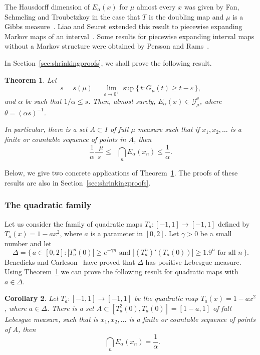 \documentclass[11pt]{article}
\newtheorem{theo}{Theorem}[section]
\newtheorem{coro}[theo]{Corollary}
\theoremstyle{definition}
\numberwithin{equation}{section}
\numberwithin{figure}{section}
\numberwithin{table}{section}
\DeclareMathOperator{\dimh}{dim_H}
\DeclareMathOperator{\udimh}{\overline{dim}_H}
\begin{document}
The Hausdorff dimension of $E_\alpha (x)$ for $\mu$ almost every $x$ was given by Fan, Schmeling and Troubetzkoy in the case that $T$ is the doubling map and $\mu$ is a Gibbs measure~\cite{fanschmelingtroubetzkoy}. Liao and Seuret extended this result to piecewise expanding Markov maps of an interval~\cite{liaoseuret}. Some results for piecewise expanding interval maps without a Markov structure were obtained by Persson and Rams~\cite{perssonrams}.

In Section~\ref{sec:shrinkingproofs}, we shall prove the following result.

\begin{theo}\label{the:shrinking}
Let
\[
s = s (\mu) = \lim_{\varepsilon \to 0^+} \sup \{\, t : G_\mu (t)
\geq t - \varepsilon \,\},
\]
and $\alpha$ be such that $1/\alpha \leq s$. Then, almost surely, $E_\alpha (x) \in \mathscr{G}_\mu^\theta$, where $\theta = (\alpha s)^{-1}$.

In particular, there is a set $A \subset I$ of full $\mu$ measure such that if $x_1, x_2, \ldots$ is a finite or countable sequence of points in $A$, then
\[
\frac{1}{\alpha} \frac{\udimh \mu}{s} \leq \dimh \bigcap_n E_\alpha (x_n) \leq \frac{1}{\alpha}.
\]
\end{theo}

Below, we give two concrete applications of Theorem~\ref{the:shrinking}. The proofs of these results are also in Section~\ref{sec:shrinkingproofs}.

\subsubsection{The quadratic family} \label{sec:quadratic}

Let us consider the family of quadratic maps $T_a \colon [-1,1] \to [-1,1]$ defined by $T_a (x) = 1 - a x^2$, where $a$ is a parameter in $[0,2]$. Let $\gamma > 0$ be a small number and let
\[
\Delta = \{\, a \in [0, 2] : |T_a^n (0)| \geq e^{-\gamma n} \text{ and } |(T_a^n)' (T_a(0)) | \geq 1.9^n \text{ for all } n \,\}.
\]
Benedicks and Carleson~\cite{benedickscarleson} have proved that $\Delta$ has positive Lebesgue measure. Using Theorem~\ref{the:shrinking} we can prove the following result for quadratic maps with $a \in \Delta$.

\begin{coro}\label{cor:quadratic}
Let $T_a \colon [-1,1] \to [-1,1]$ be the quadratic map $T_a (x) = 1 - a x^2$, where $a \in \Delta$. There is a set $A \subset [T_a^2 (0), T_a (0)] = [1-a,1]$ of full Lebesgue measure, such that is $x_1, x_2, \ldots$ is a finite or countable sequence of points of\/ $A$, then
\[
\dimh \bigcap_n E_\alpha (x_n) = \frac{1}{\alpha}.
\]
\end{coro}
\end{document}
